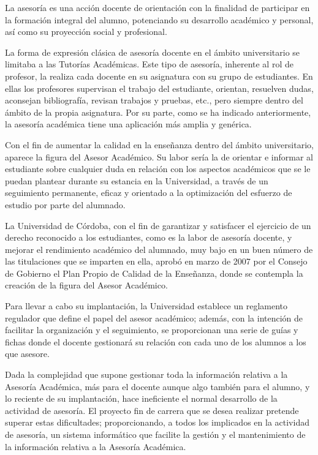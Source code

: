 
La asesoría es una acción docente de orientación con la finalidad de participar
en la formación integral del alumno, potenciando su desarrollo académico y
personal, así como su proyección social y profesional.

La forma de expresión clásica de asesoría docente en el ámbito universitario se
limitaba a las Tutorías Académicas. Este tipo de asesoría, inherente al rol de
profesor, la realiza cada docente en su asignatura con su grupo de estudiantes.
En ellas los profesores supervisan el trabajo del estudiante, orientan,
resuelven dudas, aconsejan bibliografía, revisan trabajos y pruebas, etc., pero
siempre dentro del ámbito de la propia asignatura. Por su parte, como se ha
indicado anteriormente, la asesoría académica tiene una aplicación más amplia y
genérica.

Con el fin de aumentar la calidad en la enseñanza dentro del ámbito
universitario, aparece la figura del Asesor Académico. Su labor sería la
de orientar e informar al estudiante sobre cualquier duda en relación con los
aspectos académicos que se le puedan plantear durante su estancia en la
Universidad, a través de un seguimiento permanente, eficaz y orientado a la
optimización del esfuerzo de estudio por parte del alumnado.

La Universidad de Córdoba, con el fin de garantizar y satisfacer el ejercicio de
un derecho reconocido a los estudiantes, como es la labor de asesoría docente, y
mejorar el rendimiento académico del alumnado, muy bajo en un buen número de las
titulaciones que se imparten en ella, aprobó en marzo de 2007 por el Consejo
de Gobierno el Plan Propio de Calidad de la Enseñanza, donde se contempla la
creación de la figura del Asesor Académico.

Para llevar a cabo su implantación, la Universidad establece un reglamento
regulador que define el papel del asesor académico; además, con la intención de
facilitar la organización y el seguimiento, se proporcionan una serie de guías y
fichas donde el docente gestionará su relación con cada uno de los alumnos a los
que asesore.

Dada la complejidad que supone gestionar toda la información relativa a la
Asesoría Académica, más para el docente aunque algo también para el alumno, y
lo reciente de su implantación, hace ineficiente el normal desarrollo de la
actividad de asesoría. El proyecto fin de carrera que se desea realizar
pretende superar estas dificultades; proporcionando, a todos los implicados en
la actividad de asesoría, un sistema informático que facilite la gestión y el
mantenimiento de la información relativa a la Asesoría Académica.

